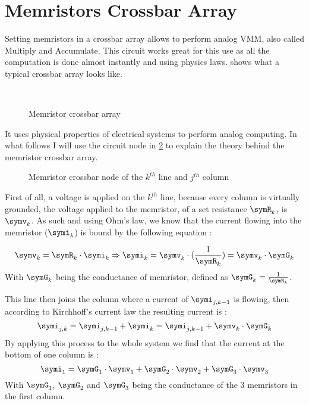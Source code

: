 \section{Memristors Crossbar Array}\label{sec:crossbar}

Setting memristors in a crossbar array allows to perform analog \ac{VMM}, also called Multiply and Accumulate. This circuit works great for this use as all the computation is done almost instantly and using physics laws.  shows what a typical crossbar array looks like.

\begin{figure}[H]
  \centering
  \hfill
  \\
  \caption{Memristor crossbar array}
  \label{fig:crossbar}
\end{figure}

It uses physical properties of electrical systems to perform analog computing. In what follows I will use the circuit node in \cref{fig:crossNode} to explain the theory behind the memristor crossbar array.
\begin{figure}[H]
  \centering
  
  \caption{Memristor crossbar node of the $k^{th}$ line and $j^{th}$ column}
  \label{fig:crossNode}
\end{figure}

First of all, a voltage is applied on the $k^{th}$ line, because every column is virtually grounded, the voltage applied to the memristor, of a set resistance $\symR_k$, is $\symv_k$. As such and using Ohm's law, we know that the current flowing into the memristor ($\symi_{k}$) is bound by the following equation :

\begin{equation}
  \symv_k = \symR_k\cdot \symi_{k} \Rightarrow \symi_{k} = \symv_k\cdot (\frac{1}{\symR_k})= \symv_k\cdot \symG_k
\end{equation}
With $\symG_k$ being the conductance of memristor, defined as $\symG_k=\frac{1}{\symR_k}$.

This line then joins the column where a current of $\symi_{j,k-1}$ is flowing, then according to Kirchhoff's current law the resulting current is :
\begin{equation}
  \symi_{j,k} = \symi_{j,k-1}+\symi_{k} = \symi_{j,k-1} + \symv_k\cdot \symG_k
\end{equation}
By applying this process to the whole system we find that the current at the bottom of one column is :
\begin{equation}
  \symi_1= \symG_1\cdot \symv_1 +  \symG_2\cdot \symv_2 +  \symG_3\cdot \symv_3
\end{equation}
With $\symG_1$, $\symG_2$ and $\symG_3$ being the conductance of the 3 memristors in the first column.


